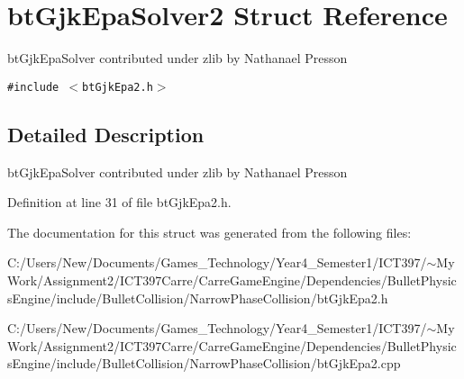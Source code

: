 \hypertarget{structbt_gjk_epa_solver2}{
\section{btGjkEpaSolver2 Struct Reference}
\label{structbt_gjk_epa_solver2}
}
btGjkEpaSolver contributed under zlib by Nathanael Presson  


{\tt \#include $<$btGjkEpa2.h$>$}



\subsection{Detailed Description}
btGjkEpaSolver contributed under zlib by Nathanael Presson 

Definition at line 31 of file btGjkEpa2.h.

The documentation for this struct was generated from the following files:\begin{CompactItemize}
\item 
C:/Users/New/Documents/Games\_\-Technology/Year4\_\-Semester1/ICT397/$\sim$My Work/Assignment2/ICT397Carre/CarreGameEngine/Dependencies/BulletPhysicsEngine/include/BulletCollision/NarrowPhaseCollision/btGjkEpa2.h\item 
C:/Users/New/Documents/Games\_\-Technology/Year4\_\-Semester1/ICT397/$\sim$My Work/Assignment2/ICT397Carre/CarreGameEngine/Dependencies/BulletPhysicsEngine/include/BulletCollision/NarrowPhaseCollision/btGjkEpa2.cpp\end{CompactItemize}
